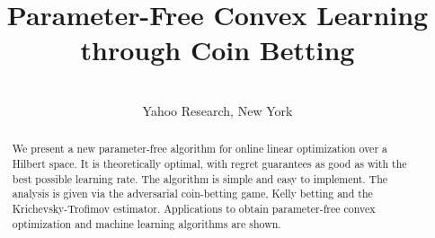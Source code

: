 \documentclass[wcp]{jmlr}
\author{%
\Name{Francesco Orabona}
\Email{francesco@orabona.com}
\AND
\Name{D\'avid P\'al}
\Email{dpal@yahoo-inc.com}\\
\addr Yahoo Research, New York}
\title{Parameter-Free Convex Learning through Coin Betting}
\begin{document}
\maketitle

\begin{abstract}
We present a new parameter-free algorithm for online linear optimization over a Hilbert space. It is theoretically optimal, with regret guarantees as good as with the best possible learning rate. The algorithm is simple and easy to implement. The analysis is given via the adversarial coin-betting game, Kelly betting and the Krichevsky-Trofimov
estimator. Applications to obtain parameter-free convex optimization and machine learning algorithms are shown.
\end{abstract}








\newpage



\end{document}
